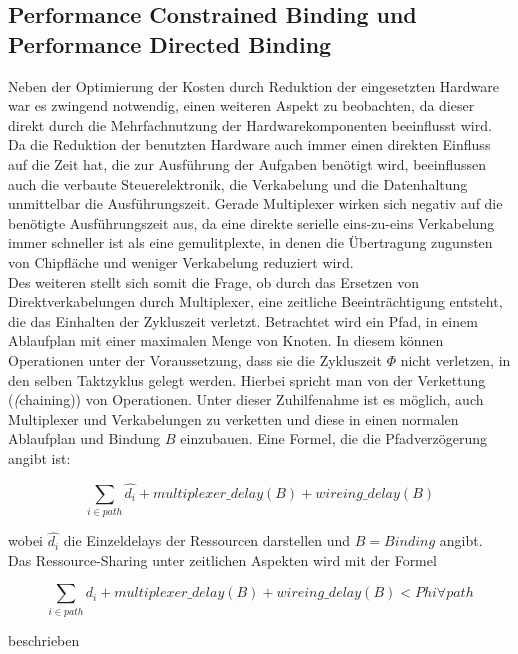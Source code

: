 \documentclass[conference]{IEEEtran}
\begin{document}
 \subsection{Performance Constrained Binding und Performance Directed Binding}
Neben der Optimierung der Kosten durch Reduktion der
eingesetzten Hardware war es zwingend notwendig, einen
weiteren Aspekt zu beobachten, da dieser direkt durch die
Mehrfachnutzung der Hardwarekomponenten beeinflusst
wird. Da die Reduktion der benutzten Hardware auch immer
einen direkten Einfluss auf die Zeit hat, die zur Ausführung
der Aufgaben benötigt wird, beeinflussen auch die verbaute
Steuerelektronik, die Verkabelung und die Datenhaltung
unmittelbar die Ausführungszeit. Gerade Multiplexer wirken
sich negativ auf die benötigte Ausführungszeit aus, da eine
direkte serielle eins-zu-eins Verkabelung immer schneller ist
als eine gemulitplexte, in denen die Übertragung zugunsten
von Chipfläche und weniger Verkabelung reduziert wird.\\
Des weiteren stellt sich somit die Frage, ob durch das Ersetzen
von Direktverkabelungen durch Multiplexer, eine zeitliche
Beeinträchtigung entsteht, die das Einhalten der Zykluszeit
verletzt. Betrachtet wird ein Pfad, in einem Ablaufplan mit
einer maximalen Menge von Knoten. In diesem können
Operationen unter der Voraussetzung, dass sie die Zykluszeit $\Phi$ nicht verletzen, in den selben Taktzyklus gelegt werden. Hierbei spricht man von der Verkettung (\textit(chaining)) von Operationen\cite[S.249]{3}. Unter dieser Zuhilfenahme ist es
möglich, auch Multiplexer und Verkabelungen zu verketten
und diese in einen normalen Ablaufplan und Bindung $B$
einzubauen. Eine Formel, die die Pfadverzögerung angibt ist:\\
\begin{center}
\begin{equation}
\sum_{i\in path} \widehat{d_i} + multiplexer\_delay(B) + wireing\_delay(B)
\end{equation}
\end{center}
wobei $\widehat{d_i} $ die Einzeldelays der Ressourcen darstellen und $B = Binding$ angibt.\\
Das Ressource-Sharing unter zeitlichen Aspekten wird mit der
Formel
\begin{center}
\begin{equation}
\sum_{i\in path}d_i + multiplexer\_delay(B) + wireing\_delay(B) < Phi  \forall path
\end{equation}
\end{center}
 beschrieben \cite[S.249]{3}
\end{document}
